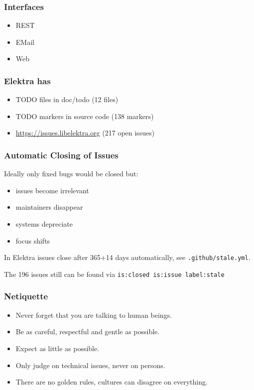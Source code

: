 \begin{frame}
	\frametitle{Interfaces}

	\begin{itemize}
		\item REST
		\item EMail
		\item Web
	\end{itemize}
\end{frame}

\begin{frame}
	\frametitle{Elektra has}
	\begin{itemize}
		\item TODO files in doc/todo (12 files)
		\item TODO markers in source code (138 markers)
		\item \url{https://issues.libelektra.org} (217 open issues)
	\end{itemize}
\end{frame}

\begin{frame}[fragile]
	\frametitle{Automatic Closing of Issues}

	Ideally only fixed bugs would be closed but:
	\begin{itemize}
	\item issues become irrelevant
	\item maintainers disappear
	\item systems depreciate
	\item focus shifts
	\end{itemize}
	\vspace{1cm}

	In Elektra issues close after 365+14 days automatically, see
	\verb+.github/stale.yml+.

	\vspace{1cm}
	The 196 issues still can be found via \verb+is:closed is:issue label:stale+
\end{frame}

\begin{frame}
	\frametitle{Netiquette}

	\begin{itemize}
		\item Never forget that you are talking to human beings.
		\item Be as careful, respectful and gentle as possible.
		\item Expect as little as possible.
		\item Only judge on technical issues, never on persons.
		\item There are no golden rules, cultures can disagree on everything.
	\end{itemize}
\end{frame}

